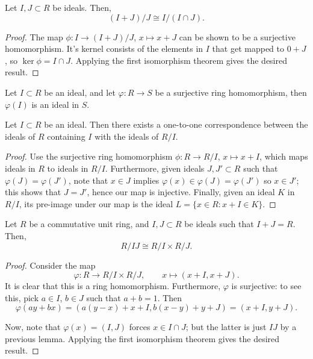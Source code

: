 \documentclass[11pt]{article}
\theoremstyle{definition}
\theoremstyle{remark}
\numberwithin{equation}{section}
\begin{document}
    \begin{theorem}
        Let $I, J \subset R$ be ideals. Then, \[
            (I + J)/J \cong I/(I \cap J).
        \] 
    \end{theorem}
    \begin{proof}
        The map $\phi\colon I \to (I + J)/J$, $x \mapsto x + J$ can be shown to be a
        surjective homomorphism. It's kernel consists of the elements in $I$ that get
        mapped to $0 + J$, so $\ker{\phi} = I \cap J$. Applying the first isomorphism
        theorem gives the desired result.
    \end{proof}

    \begin{lemma}
        Let $I \subset R$ be an ideal, and let $\varphi\colon R \to S$ be a
        surjective ring homomorphism, then $\varphi(I)$ is an ideal in $S$.
    \end{lemma}

    \begin{theorem}
        Let $I \subset R$ be an ideal. Then there exists a one-to-one correspondence
        between the ideals of $R$ containing $I$ with the ideals of $R/I$.
    \end{theorem}
    \begin{proof}
        Use the surjective ring homomorphism $\phi\colon R \to R/I$, $x \mapsto x +
        I$, which maps ideals in $R$ to ideals in $R/I$. Furthermore, given ideals
        $J, J' \subset R$ such that $\varphi(J) = \varphi(J')$, note that $x \in J$
        implies $\varphi(x) \in \varphi(J) = \varphi(J')$ so $x \in J'$; this shows
        that $J = J'$, hence our map is injective. Finally, given an ideal $K$ in
        $R/I$, its pre-image under our map is the ideal $L = \{x \in R: x + I \in
        K\}$.
    \end{proof}


    \begin{theorem}
        Let $R$ be a commutative unit ring, and $I, J \subset R$ be ideals such that
        $I + J = R$. Then, \[
            R / IJ \cong R/I \times R/J.
        \] 
    \end{theorem}
    \begin{proof}
        Consider the map \[
            \varphi\colon R \to R/I \times R/J, \qquad x \mapsto (x + I, x + J).
        \] It is clear that this is a ring homomorphism. Furthermore, $\varphi$ is
        surjective: to see this, pick $a \in I$, $b \in J$ such that $a + b = 1$.
        Then \[
            \varphi(ay + bx) = (a(y - x) + x + I, b(x - y) + y + J) = (x + I, y + J).
        \] 

        Now, note that $\varphi(x) = (I, J)$ forces $x \in I \cap J$; but the latter
        is just $IJ$ by a previous lemma. Applying the first isomorphism theorem
        gives the desired result.
    \end{proof}
\end{document}
